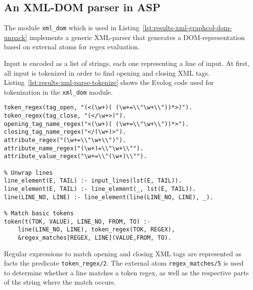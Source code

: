 \subsection{An XML-DOM parser in ASP}
\label{subsec:results-xml-parsing-details}

The module \texttt{xml\_dom} which is used in Listing~\ref{lst:results-xml-graphcol-dom-unpack} implements a generic XML-parser that generates a DOM-representation based on external atoms for regex evaluation.

Input is encoded as a list of strings, each one representing a line of input. At first, all input is tokenized in order to find opening and closing XML tags. Listing~\ref{lst:results-xml-parse-tokenize} shows the Evolog code used for tokenization in the \texttt{xml\_dom} module.

\begin{lstlisting}[style=asp-code, label={lst:results-xml-parse-tokenize}, caption={Tokenizing XML input.}]
token_regex(tag_open, "(<(\w+)( (\w+=\\"\w+\\"))*>)").
token_regex(tag_close, "(</\w+>)").
opening_tag_name_regex("<(\w+)( (\w+=\\"\w+\\"))*>").
closing_tag_name_regex("</(\w+)>").
attribute_regex("(\w+=\\"\w+\\")").
attribute_name_regex("(\w+)=\\"\w+\\"").
attribute_value_regex("\w+=\\"(\w+)\\"").

% Unwrap lines
line_element(E, TAIL) :- input_lines(lst(E, TAIL)).
line_element(E, TAIL) :- line_element(_, lst(E, TAIL)).
line(LINE_NO, LINE) :- line_element(line(LINE_NO, LINE), _).

% Match basic tokens
token(t(TOK, VALUE), LINE_NO, FROM, TO) :- 
    line(LINE_NO, LINE), token_regex(TOK, REGEX), 
    &regex_matches[REGEX, LINE](VALUE,FROM, TO). 
\end{lstlisting}

Regular expressions to match opening and closing XML tags are represented as facts the predicate \texttt{token\_regex/2}. The external atom \texttt{regex\_matches/5} is used to determine whether a line matches a token regex, as well as the respective parts of the string where the match occurs.

